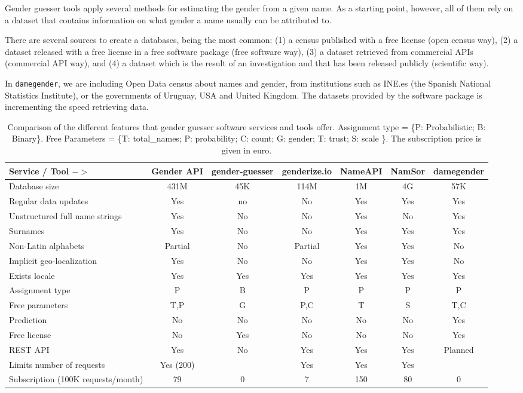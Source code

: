 \documentclass[a4paper]{article}
\def\infinity{\rotatebox{90}{8}}
\begin{document}
Gender guesser tools apply several methods for estimating the gender from a given name. 
As a starting point, however, all of them rely on a dataset that contains information on what gender a name usually can be attributed to.

There are several sources to create a databases, being the most common:  
(1) a census published with a free license (open census way), 
(2) a dataset released with a free license in a free software package (free software way), 
(3) a dataset retrieved from commercial APIs (commercial API way), and
(4) a dataset which is the result of an investigation and that has been released publicly (scientific way).

In \texttt{damegender}, we are including Open Data census about names and gender, from institutions such as INE.es (the Spanish National Statistics Institute), or the governments of Uruguay, USA and United Kingdom. The datasets provided by the software package is incrementing the speed retrieving data.

\begin{table*}[ht]
\footnotesize
\begin{tabular}[]{lcccccc}
\hline
Service / Tool $->$ & Gender API & gender-guesser & genderize.io & NameAPI & NamSor & damegender\tabularnewline
\hline
Database size & 431M & 45K & 114M & 1M & 4G & 57K \tabularnewline
Regular data updates & Yes & no & No & Yes & Yes & Yes\tabularnewline
Unstructured full name strings & Yes & No & No & Yes & No & Yes\tabularnewline
Surnames & Yes & No & No & Yes & Yes & Yes\tabularnewline
Non-Latin alphabets & Partial & No & Partial & Yes & Yes & No\tabularnewline
Implicit geo-localization & Yes & No & No & Yes & Yes & No\tabularnewline
Exists locale & Yes & Yes & Yes & Yes & Yes & Yes\tabularnewline
Assignment type & P & B & P & P & P & P \tabularnewline
Free parameters & T,P & G & P,C & T & S & T,C\tabularnewline
Prediction & No & No & No & No & No & Yes\tabularnewline
Free license & No & Yes & No & No & No & Yes\tabularnewline
REST API & Yes & No & Yes & Yes & Yes & Planned\tabularnewline
Limits number of requests & Yes (200) & \infinity & Yes & Yes & Yes & \infinity \tabularnewline
Subscription (100K requests/month)	 & 79 & 0 & 7 & 150 & 80 & 0 \tabularnewline
\hline
\end{tabular}
\caption{Comparison of the different features that gender guesser software services and tools offer. Assignment type = \{P: Probabilistic; B: Binary\}. Free Parameters = \{T: total\_names; P: probability; C: count; G: gender; T: trust; S: scale \}. The subscription price is given in euro.}
\label{table:comparison}
\end{table*}
\end{document}
